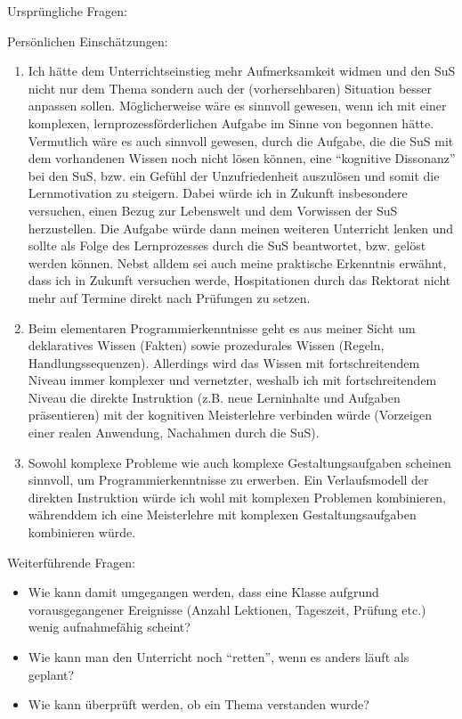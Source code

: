 \begin{myExBox}[title=Persönliche Beantwortung der Fragestellungen]
Ursprüngliche Fragen:
\fragestellungen

Persönlichen Einschätzungen:
\begin{enumerate}
\item Ich hätte dem Unterrichtseinstieg mehr Aufmerksamkeit widmen und den SuS nicht nur dem Thema sondern auch der (vorhersehbaren) Situation besser anpassen sollen. Möglicherweise wäre es sinnvoll gewesen, wenn ich mit einer komplexen, lernprozessförderlichen Aufgabe im Sinne von \cite{tulo} begonnen hätte. Vermutlich wäre es auch sinnvoll gewesen, durch die Aufgabe, die die SuS mit dem vorhandenen Wissen noch nicht lösen können, eine ``kognitive Dissonanz'' bei den SuS, bzw. ein Gefühl der Unzufriedenheit auszulösen und somit die Lernmotivation zu steigern. Dabei würde ich in Zukunft insbesondere versuchen, einen Bezug zur Lebenswelt und dem Vorwissen der SuS herzustellen. Die Aufgabe würde dann meinen weiteren Unterricht lenken und sollte als Folge des Lernprozesses durch die SuS beantwortet, bzw. gelöst werden können. Nebst alldem sei auch meine praktische Erkenntnis erwähnt, dass ich in Zukunft versuchen werde, Hospitationen durch das Rektorat nicht mehr auf Termine direkt nach Prüfungen zu setzen.
\item Beim elementaren Programmierkenntnisse geht es aus meiner Sicht um deklaratives Wissen (Fakten) sowie prozedurales Wissen (Regeln, Handlungssequenzen). Allerdings wird das Wissen mit fortschreitendem Niveau immer komplexer und vernetzter, weshalb ich mit fortschreitendem Niveau die direkte Instruktion (z.B. neue Lerninhalte und Aufgaben präsentieren) mit der kognitiven Meisterlehre verbinden würde (Vorzeigen einer realen Anwendung, Nachahmen durch die SuS).
\item Sowohl komplexe Probleme wie auch komplexe Gestaltungsaufgaben scheinen sinnvoll, um Programmierkenntnisse zu erwerben. Ein Verlaufsmodell der direkten Instruktion würde ich wohl mit komplexen Problemen kombinieren, währenddem ich eine Meisterlehre mit komplexen Gestaltungsaufgaben kombinieren würde.
\end{enumerate}
Weiterführende Fragen:
\begin{itemize}
\item Wie kann damit umgegangen werden, dass eine Klasse aufgrund vorausgegangener Ereignisse (Anzahl Lektionen, Tageszeit, Prüfung etc.) wenig aufnahmefähig scheint?
\item Wie kann man den Unterricht noch ``retten'', wenn es anders läuft als geplant?
\item Wie kann überprüft werden, ob ein Thema verstanden wurde?
\end{itemize}


\end{myExBox}
